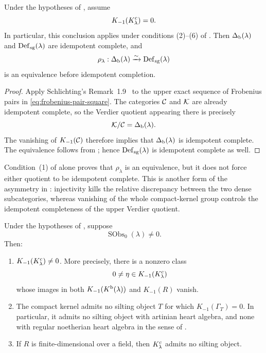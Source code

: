 \begin{corollary}\label{cor:negative-k-completeness}
Under the hypotheses of , assume
\[
 K_{-1}(K^c_\lambda)=0.
\]
In particular, this conclusion applies under conditions \textup{(2)--(6)} of .  Then \(\Delta_{\mathrm b}(\lambda)\) and \(\operatorname{Def}_{\mathrm{sg}}(\lambda)\) are idempotent complete, and
\[
 \rho_\lambda:\Delta_{\mathrm b}(\lambda)\xrightarrow{\sim}\operatorname{Def}_{\mathrm{sg}}(\lambda)
\]
is an equivalence before idempotent completion.
\end{corollary}

\begin{proof}
Apply Schlichting's Remark~1.9~\cite{Schlichting06} to the upper exact sequence of Frobenius pairs in \eqref{eq:frobenius-pair-square}.  The categories \(\mathcal C\) and \(\mathcal K\) are already idempotent complete, so the Verdier quotient appearing there is precisely
\[
 \mathcal K/\mathcal C=\Delta_{\mathrm b}(\lambda).
\]
The vanishing of \(K_{-1}(\mathcal C)\) therefore implies that \(\Delta_{\mathrm b}(\lambda)\) is idempotent complete.  The equivalence follows from ; hence \(\operatorname{Def}_{\mathrm{sg}}(\lambda)\) is idempotent complete as well.
\end{proof}

\begin{remark}\label{rem:injectivity-without-completeness}
Condition~\textup{(1)} of  alone proves that \(\rho_\lambda\) is an equivalence, but it does not force either quotient to be idempotent complete.  This is another form of the asymmetry in : injectivity kills the relative discrepancy between the two dense subcategories, whereas vanishing of the whole compact-kernel group controls the idempotent completeness of the upper Verdier quotient.
\end{remark}

\begin{theorem}\label{thm:negative-k-residue}
Under the hypotheses of , suppose
\[
 \operatorname{SObs}_0(\lambda)\ne0.
\]
Then:
\begin{enumerate}[label=\textup{(\arabic*)}]
\item \(K_{-1}(K^c_\lambda)\ne0\).  More precisely, there is a nonzero class
\[
 0\ne\eta\in K_{-1}(K^c_\lambda)
\]
whose images in both \(K_{-1}(K^{\mathrm b}(\lambda))\) and \(K_{-1}(R)\) vanish.
\item The compact kernel admits no silting object \(T\) for which \(K_{-1}(\Gamma_T)=0\).  In particular, it admits no silting object with artinian heart algebra, and none with regular noetherian heart algebra in the sense of .
\item If \(R\) is finite-dimensional over a field, then \(K^c_\lambda\) admits no silting object.
\end{enumerate}
\end{theorem}

